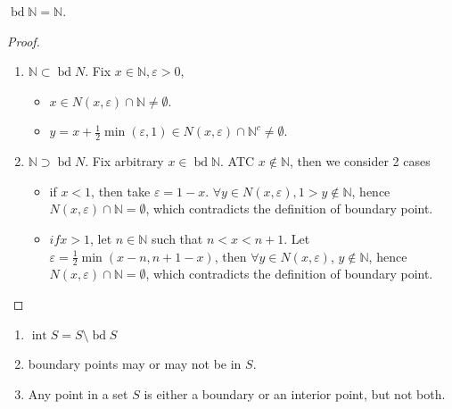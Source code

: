 \begin{example}
    $\operatorname{bd} \mathbb{N} = \mathbb{N}$.
\end{example}
\begin{proof}
    \begin{enumerate}
        \item $\mathbb{N} \subset \operatorname{bd}  N$.
Fix $x \in \mathbb{N}, \varepsilon > 0$, 
        \begin{itemize}
            \item 
$x \in N(x, \varepsilon) \cap \mathbb{N} \neq \emptyset$. 
            \item 
$y = x + \frac{1}{2} \min(\varepsilon, 1) \in N(x, \varepsilon) \cap \mathbb{N}^c \neq \emptyset$.
        \end{itemize} 
        \item $\mathbb{N} \supset \operatorname{bd}  N$. Fix arbitrary $x \in \operatorname{bd} \mathbb{N}$. 
ATC $x \notin \mathbb{N}$, then we consider 2 cases
\begin{itemize}
    \item if $x < 1$, then take $\varepsilon = 1 - x$. 
$\forall y \in N(x, \varepsilon), 1 > y \notin \mathbb{N}$, 
hence $N(x, \varepsilon) \cap \mathbb{N} = \emptyset$, 
which contradicts the definition of boundary point. 
    \item $if x > 1$, let $n \in \mathbb{N}$ such that 
$n < x < n + 1$. Let $\varepsilon = \frac{1}{2}\min(x - n, n + 1 - x)$, then 
$\forall y \in N(x, \varepsilon)$, $y \notin \mathbb{N}$, 
hence $N(x, \varepsilon) \cap \mathbb{N} = \emptyset$, 
which contradicts the definition of boundary point. 
\end{itemize} 
    \end{enumerate}
\end{proof}

\begin{remark}
    \hfill 
    \begin{enumerate}
        \item $\operatorname{int} S = S \setminus \operatorname{bd} S$
        \item boundary points may or may not be in $S$. 
        \item Any point in a set $S$ is either a boundary or an interior point, but not both.
    \end{enumerate}
\end{remark}


















